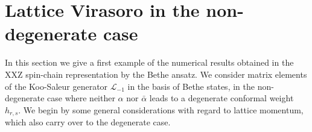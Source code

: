 \documentclass[a4paper,10pt]{article}
\newcommand{\q}{\mathfrak{q}}
\newcommand{\linnea}[1]{$\framebox{\tiny L}$\ \textbf{\texttt{{\color{red}\footnotesize#1}}}}
\newcommand{\aSt}{\mathcal{W}}
\newcommand{\AStTL}[2]{\aSt_{#1,#2}}
\newcommand{\KSgen}{\mathcal{L}}
\newcommand{\LnMat}[1]{\mathbcal{L}_{#1}}
\begin{document}
 


 
 




\section{Lattice Virasoro in the non-degenerate case}\label{sec:lattVir1}



In this section we give a first example of the numerical results obtained in the XXZ spin-chain representation by the Bethe ansatz. %
We consider matrix elements of the Koo-Saleur generator $\KSgen_{-1}$ in the basis of Bethe states, in the non-degenerate case where neither $\alpha$ nor $\bar{\alpha}$ leads to a degenerate conformal weight $h_{r,s}$. We begin by some general considerations with regard to lattice momentum, which also carry over to the degenerate case. 


\end{document}
